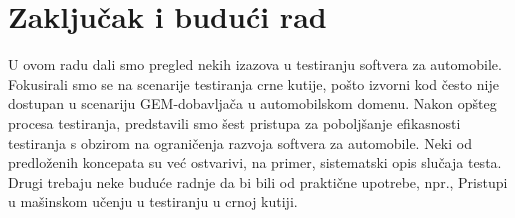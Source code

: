 \documentclass[a4paper]{article}
\begin{document}
\section{Zaključak i budući rad}
\label{sec:zakljucak}

U ovom radu dali smo pregled nekih izazova u testiranju softvera za automobile. Fokusirali smo se na scenarije testiranja crne kutije, pošto izvorni kod često nije dostupan u scenariju GEM-dobavljača u automobilskom domenu. Nakon opšteg procesa testiranja, predstavili smo šest pristupa za poboljšanje efikasnosti testiranja s obzirom na ograničenja razvoja softvera za automobile. Neki od predloženih koncepata su već ostvarivi,
na primer, sistematski opis slučaja testa. Drugi trebaju neke buduće radnje da bi bili od praktične upotrebe, npr., Pristupi u mašinskom učenju u testiranju u crnoj kutiji.
\bigbreak
\end{document}
